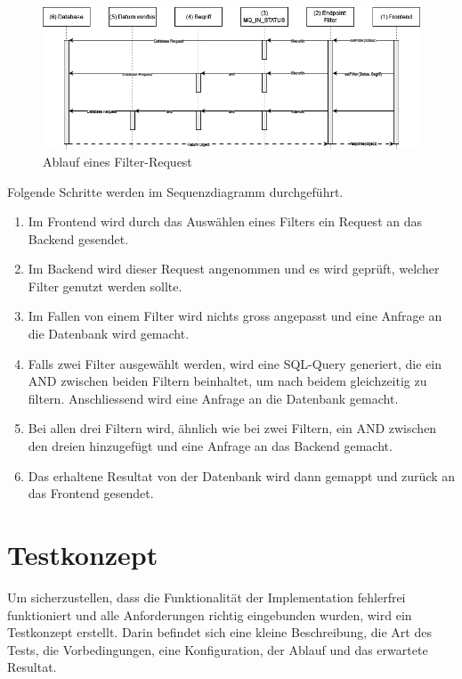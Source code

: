 \begin{figure}[H]
	\begin{center}
		\includegraphics[width=1\textwidth]{ressourcen/Sequenzdiagramm-Erweiterung}
		\caption[Ablauf eines Filter-Request]{Ablauf eines Filter-Request}\label{fig:sequenzdiagramm-erweiterung-filter}
	\end{center}
\end{figure}

Folgende Schritte werden im Sequenzdiagramm durchgeführt.
\begin{enumerate}
	\item Im Frontend wird durch das Auswählen eines Filters ein Request an das Backend gesendet.
	\item Im Backend wird dieser Request angenommen und es wird geprüft, welcher Filter genutzt werden sollte.
	\item Im Fallen von einem Filter wird nichts gross angepasst und eine Anfrage an die Datenbank wird gemacht.
	\item Falls zwei Filter ausgewählt werden, wird eine SQL-Query generiert, die ein AND zwischen beiden Filtern beinhaltet, um nach beidem gleichzeitig zu filtern. Anschliessend wird eine Anfrage an die Datenbank gemacht.
	\item Bei allen drei Filtern wird, ähnlich wie bei zwei Filtern, ein AND zwischen den dreien hinzugefügt und eine Anfrage an das Backend gemacht.
	\item Das erhaltene Resultat von der Datenbank wird dann gemappt und zurück an das Frontend gesendet.
\end{enumerate}

\section{Testkonzept}
Um sicherzustellen, dass die Funktionalität der Implementation fehlerfrei funktioniert und alle Anforderungen richtig eingebunden wurden, wird ein Testkonzept erstellt. Darin befindet sich eine kleine Beschreibung, die Art des Tests, die Vorbedingungen, eine Konfiguration, der Ablauf und das erwartete Resultat.

